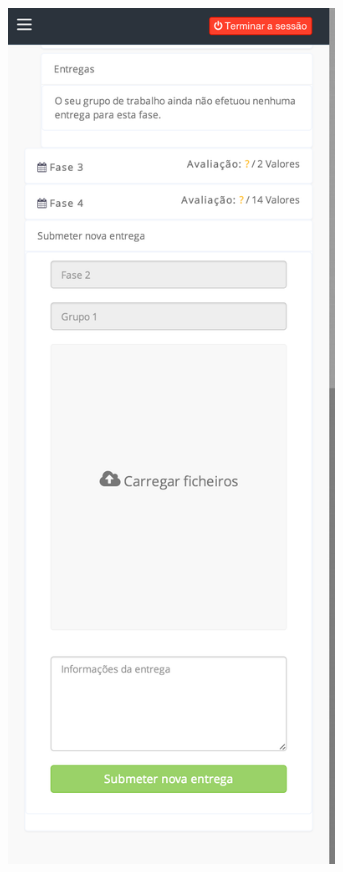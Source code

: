 \begin{figure}[H]
\begin{subfigure}{0.45\textwidth}
 		\label{fig:project_small}
 	\end{subfigure}
 	\begin{subfigure}{0.45\textwidth}
 		\centering
 		\includegraphics[width=0.95\textwidth]{images/implementacao/alunos/entrega}
 		\label{fig:delivery_small}
 	\end{subfigure}
 \end{figure}




